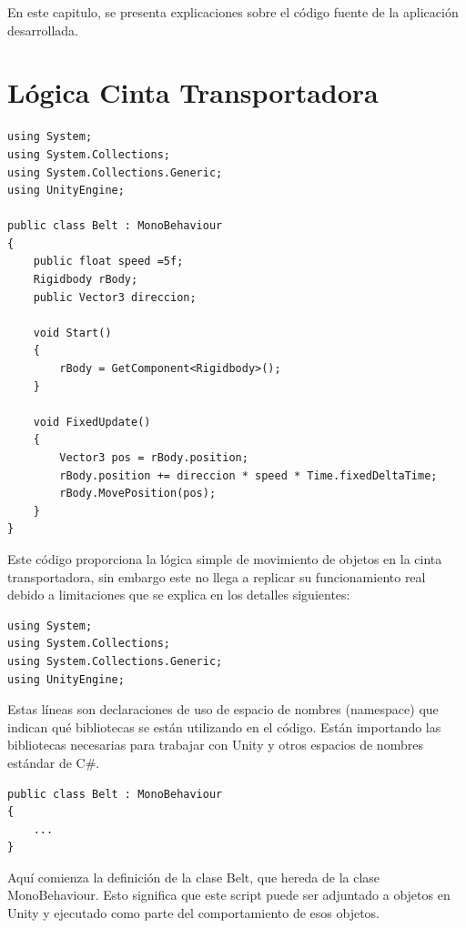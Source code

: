 En este capitulo, se presenta explicaciones sobre el código fuente de la aplicación desarrollada.
\section{Lógica Cinta Transportadora} 
\lstset{language=[Sharp]C, breaklines=true, basicstyle=\footnotesize}
\begin{lstlisting}[frame=single]
using System;
using System.Collections;
using System.Collections.Generic;
using UnityEngine;

public class Belt : MonoBehaviour
{
    public float speed =5f;
    Rigidbody rBody;
    public Vector3 direccion;

    void Start()
    {
        rBody = GetComponent<Rigidbody>();
    }

    void FixedUpdate()
    {
        Vector3 pos = rBody.position;
        rBody.position += direccion * speed * Time.fixedDeltaTime;
        rBody.MovePosition(pos);
    }
}
\end{lstlisting}
Este código proporciona la lógica simple de movimiento de objetos en la cinta transportadora, sin embargo este no llega a replicar su funcionamiento real debido a limitaciones que se explica en los detalles siguientes:

\begin{lstlisting}[frame=single]
using System;
using System.Collections;
using System.Collections.Generic;
using UnityEngine;
\end{lstlisting}
Estas líneas son declaraciones de uso de espacio de nombres (namespace) que indican qué bibliotecas se están utilizando en el código. Están importando las bibliotecas necesarias para trabajar con Unity y otros espacios de nombres estándar de C\#.

\begin{lstlisting}[frame=single]
public class Belt : MonoBehaviour
{
    ...
}
\end{lstlisting}
Aquí comienza la definición de la clase Belt, que hereda de la clase MonoBehaviour. Esto significa que este script puede ser adjuntado a objetos en Unity y ejecutado como parte del comportamiento de esos objetos.

